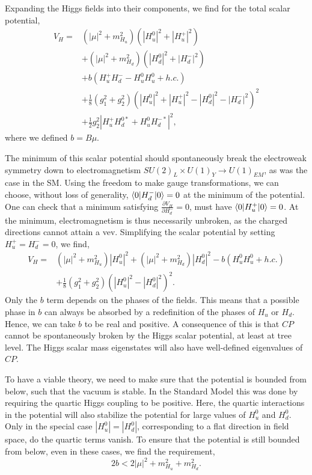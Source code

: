 Expanding the Higgs fields into their components, we find for the total scalar potential,
\begin{align}
  V_H = & \left( |\mu|^2 + m_{H_u}^2 \right)\left( |H_u^0|^2 + |H_u^+|^2 \right) \\
	& + \left( |\mu|^2 + m_{H_d}^2 \right)\left( |H_d^0|^2 + |H_d^-|^2 \right) \\
     & + b\left( H_u^+ H_d^- - H_u^0 H_u^0 + h.c.\right)  \\
     & + \frac{1}{8} \left( g_1^2 + g_2^2 \right) \left( |H_u^0|^2 + |H_u^+|^2 - |H_d^0|^2 -
|H_d^-|^2 \right)^2 \\
    & + \frac{1}{2} g_2^2 |H_u^+ H_d^{0*} + H_u^0 H_d^{-*}|^2 ,
\end{align}
where we defined $b = B \mu$.


The minimum of this scalar potential should spontaneously break the electroweak symmetry down to
electromagnetism $SU(2)_L \times U(1)_Y \rightarrow U(1)_{EM}$, as was the case in the SM. 
Using the freedom to make gauge transformations, we can choose, without loss of generality,
$\braket{0|H_d^-|0} = 0$ at the minimum of the potential. 
One can check that a minimum satisfying $\frac{\partial V_H}{\partial H_d^-} = 0$, must have
$\braket{0|H_u^+|0} = 0$. At the minimum, electromagnetism is thus necessarily unbroken, as the
charged directions cannot attain a vev.
Simplifying the scalar potential by setting $H_u^+ = H_d^- = 0$, we find,
\begin{equation}
  \begin{aligned}
  V_H = & \left( |\mu|^2 + m_{H_u}^2 \right) |H_u^0|^2  + \left( |\mu|^2 + m_{H_d}^2 \right)
|H_d^0|^2 - b\left( H_u^0 H_u^0 + h.c.\right)  \\
     & + \frac{1}{8} \left( g_1^2 + g_2^2 \right) \left( |H_u^0|^2  - |H_d^0|^2 \right)^2 .
\end{aligned}
\end{equation}
Only the $b$ term depends on the phases of the fields. This means that a possible phase in $b$ can
always be absorbed by a redefinition of the phases of $H_u$ or $H_d$. Hence, we can take $b$ to be
real and positive. A consequence of this is that $CP$ cannot be spontaneously broken by the Higgs
scalar potential, at least at tree level. The Higgs scalar mass eigenstates will also have
well-defined eigenvalues of $CP$. 

To have a viable theory, we need to make sure that the potential is bounded from below, such that
the vacuum is stable. 
In the Standard Model this was done by requiring the quartic Higgs coupling to be positive. 
Here, the quartic interactions in the potential will also stabilize the potential for large values
of $H_u^0$ and $H_d^0$. Only in the special case $|H_u^0| = |H_d^0|$, corresponding to a flat
direction in field space, do the quartic terms vanish. To ensure that the potential is still bounded
from below, even in these cases, we find the requirement,
\begin{equation}
  2b < 2 |\mu|^2 + m_{H_u}^2 + m_{H_d}^2 .
\end{equation}

